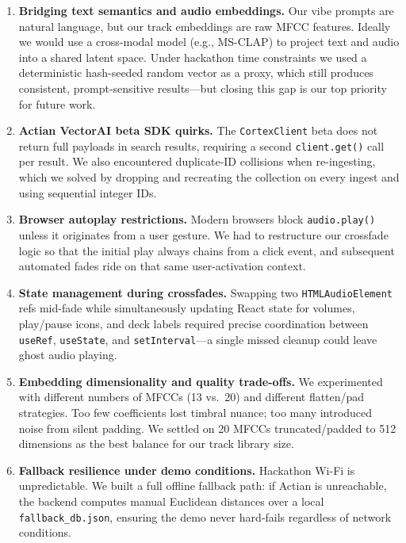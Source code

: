 \documentclass[11pt,a4paper]{article}
\begin{document}
\begin{enumerate}[leftmargin=1.5em]
  \item \textbf{Bridging text semantics and audio embeddings.}
        Our vibe prompts are natural language, but our track embeddings are raw MFCC features.
        Ideally we would use a cross-modal model (e.g., MS-CLAP) to project text and audio into a shared latent space.
        Under hackathon time constraints we used a deterministic hash-seeded random vector as a proxy, which still produces consistent, prompt-sensitive results---but closing this gap is our top priority for future work.

  \item \textbf{Actian VectorAI beta SDK quirks.}
        The \texttt{CortexClient} beta does not return full payloads in search results, requiring a second \texttt{client.get()} call per result.
        We also encountered duplicate-ID collisions when re-ingesting, which we solved by dropping and recreating the collection on every ingest and using sequential integer IDs.

  \item \textbf{Browser autoplay restrictions.}
        Modern browsers block \texttt{audio.play()} unless it originates from a user gesture.
        We had to restructure our crossfade logic so that the initial play always chains from a click event, and subsequent automated fades ride on that same user-activation context.

  \item \textbf{State management during crossfades.}
        Swapping two \texttt{HTMLAudioElement} refs mid-fade while simultaneously updating React state for volumes, play/pause icons, and deck labels required precise coordination between \texttt{useRef}, \texttt{useState}, and \texttt{setInterval}---a single missed cleanup could leave ghost audio playing.

  \item \textbf{Embedding dimensionality and quality trade-offs.}
        We experimented with different numbers of MFCCs (13 vs.\ 20) and different flatten/pad strategies.
        Too few coefficients lost timbral nuance; too many introduced noise from silent padding.
        We settled on 20 MFCCs truncated/padded to 512 dimensions as the best balance for our track library size.

  \item \textbf{Fallback resilience under demo conditions.}
        Hackathon Wi-Fi is unpredictable.
        We built a full offline fallback path: if Actian is unreachable, the backend computes manual Euclidean distances over a local \texttt{fallback\_db.json}, ensuring the demo never hard-fails regardless of network conditions.
\end{enumerate}

\end{document}
